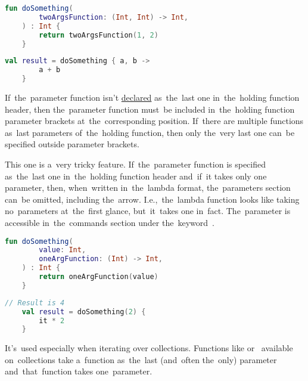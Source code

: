 \example
\begin{lstlisting}[language=Kotlin, title={Function taking other function as the~only parameter}]
    fun doSomething(
        twoArgsFunction: (Int, Int) -> Int,
    ) : Int {
        return twoArgsFunction(1, 2)
    }
\end{lstlisting}
\begin{lstlisting}[language=Kotlin, title={Usage}]
    val result = doSomething { a, b ->
        a + b
    }
\end{lstlisting}
\newline

\noindent If~the~parameter function isn't \hyperref[declarationdefinition]{declared} as~the~last one in~the~holding function header, then the~parameter function must~be included in~the~holding function parameter brackets at~the~corresponding position.
If~there are multiple functions as~last parameters of~the~holding function, then only the~very last one can~be specified outside parameter brackets.

This one is a~very tricky feature.
If~the~parameter function is specified as~the~last one in~the~holding function header and~if~it takes only one parameter, then, when~written in~the~lambda format, the~parameters section can~be omitted, including the~arrow.
I.e.,~the~lambda function looks like taking no~parameters at~the~first glance, but~it~takes one in~fact.
The~parameter is accessible in~the~commands section under \mbox{the keyword }.

\example
\begin{lstlisting}[language=Kotlin, title={Function taking other function as the~last parameter, that one takes one parameter}]
    fun doSomething(
        value: Int,
        oneArgFunction: (Int) -> Int,
    ) : Int {
        return oneArgFunction(value)
    }
\end{lstlisting}
\begin{lstlisting}[language=Kotlin, title={Usage}]
    // Result is 4
    val result = doSomething(2) {
        it * 2
    }
\end{lstlisting}
\newline

\noindent It's~used especially when iterating over collections.
Functions like  or~ available on~collections take a~function as~the~last (and~often the~only) parameter and~that~function takes one~parameter.

